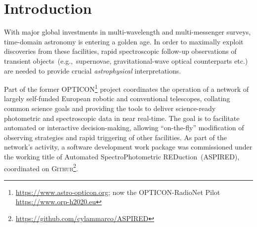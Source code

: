 \documentclass[linenumbers, twocolumn]{aastex631}
\begin{document}


\section{Introduction}
With major global investments in multi-wavelength and multi-messenger surveys,
time-domain astronomy is entering a golden age. In order to maximally exploit
discoveries from these facilities, rapid spectroscopic follow-up observations
of transient objects~(e.g.,\ supernovae, gravitational-wave optical counterparts
etc.) are needed to provide crucial {\em astrophysical} interpretations. 

Part of
the former OPTICON\footnote{\url{https://www.astro-opticon.org}; now the
OPTICON-RadioNet Pilot \url{https://www.orp-h2020.eu}} project coordinates the
operation of a network of largely self-funded European robotic and conventional
telescopes, collating common science goals and providing the tools to deliver
science-ready photometric and spectroscopic data in near real-time. The goal is
to facilitate automated or interactive decision-making, allowing ``on-the-fly''
modification of observing strategies and rapid triggering of other facilities.
As part of the network's activity, a software development work package was
commissioned under the working title of Automated SpectroPhotometric
REDuction~(\textsc{ASPIRED}), coordinated on
\textsc{Github}\footnote{\url{https://github.com/cylammarco/ASPIRED}}.
\end{document}
